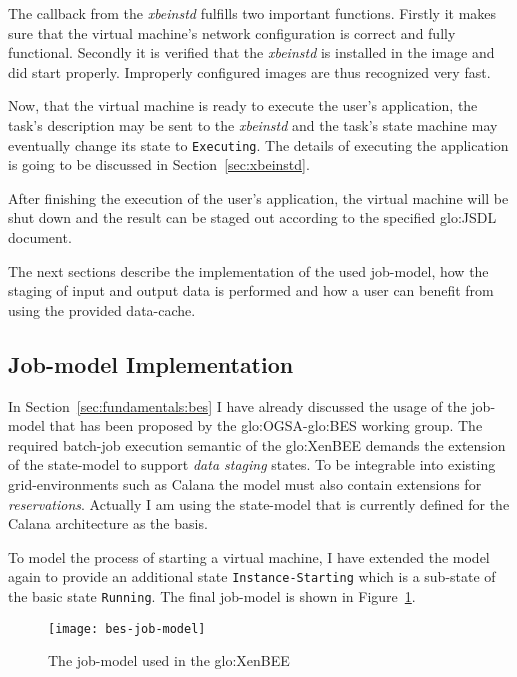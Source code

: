 The callback  from the  \emph{xbeinstd} fulfills two  important functions.
Firstly it makes sure that  the virtual machine's network configuration is
correct  and   fully  functional.   Secondly  it  is   verified  that  the
\emph{xbeinstd}  is  installed  in  the  image  and  did  start  properly.
Improperly configured images are thus recognized very fast.

Now, that the virtual machine  is ready to execute the user's application,
the task's description  may be sent to the  \emph{xbeinstd} and the task's
state machine  may eventually change its state  to \texttt{Executing}. The
details  of  executing  the  application  is  going  to  be  discussed  in
Section~\ref{sec:xbeinstd}.

After  finishing the  execution  of the  user's  application, the  virtual
machine will  be shut down and the  result can be staged  out according to
the specified \gls{glo:JSDL} document.

The next sections  describe the implementation of the  used job-model, how
the staging  of input  and output data  is performed  and how a  user can
benefit from using the provided data-cache.

\subsection{Job-model Implementation}
\label{sec:xbed:job-model}

In Section~\ref{sec:fundamentals:bes}  I have already  discussed the usage
of     the    job-model     that    has     been    proposed     by    the
\gls{glo:OGSA}-\gls{glo:BES}   working  group.   The   required  batch-job
execution semantic  of the \gls{glo:XenBEE}  demands the extension  of the
state-model to  support \emph{data staging} states. To  be integrable into
existing  grid-environments such  as Calana  the model  must  also contain
extensions for  \emph{reservations}. Actually  I am using  the state-model
that is currently defined for the Calana architecture as the basis.

To model  the process of starting  a virtual machine, I  have extended the
model  again  to provide  an  additional state  \texttt{Instance-Starting}
which  is a  sub-state  of  the basic  state  \texttt{Running}. The  final
job-model is shown in Figure~\ref{fig:bes-job-model}.

\begin{figure}[ht]
  \centering
  \texttt{[image: bes-job-model]}
  \caption{The job-model used in the \gls{glo:XenBEE}}
  \label{fig:bes-job-model}
\end{figure}

